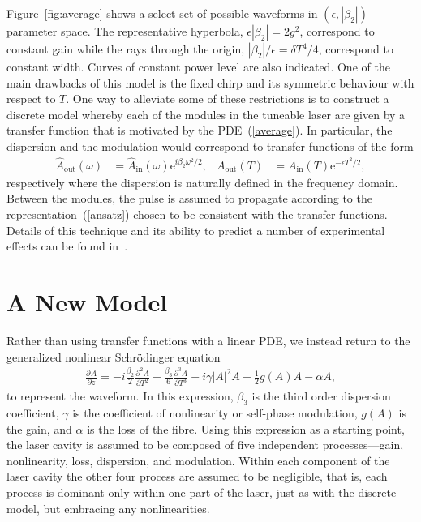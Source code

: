\documentclass[12pt]{article}
\newcommand{\pdiff}[3][]{\frac{\partial^{#1}#2}{\partial{#3}^{#1}}}
\begin{document}
Figure~\ref{fig:average} shows a select set of possible waveforms in $(\epsilon,|\beta_2|)$ parameter space. The representative hyperbola, $\epsilon|\beta_2| = 2g^2$, correspond to constant gain while the rays through the origin, $|\beta_2|/\epsilon = \delta T^4/4$, correspond to constant width. Curves of constant power level are also indicated. One of the main drawbacks of this model is the fixed chirp and its symmetric behaviour with respect to $T$. One way to alleviate some of these restrictions is to construct a discrete model whereby each of the modules in the tuneable laser are given by a transfer function that is motivated by the PDE~(\ref{average}). In particular, the dispersion and the modulation would correspond to transfer functions of the form
\begin{align}
	\widehat{A}_{\textrm{out}}(\omega) &= \widehat{A}_{\textrm{in}}(\omega)\textrm{e}^{i\beta_2\omega^2/2},&
	A_{\textrm{out}}(T) &= A_{\textrm{in}}(T)\textrm{e}^{-\epsilon T^2/2},
\end{align}
respectively where the dispersion is naturally defined in the frequency domain. Between the modules, the pulse is assumed to propagate according to the representation~(\ref{ansatz}) chosen to be consistent with the transfer functions. Details of this technique and its ability to predict a number of experimental effects can be found in~\cite{burgoyne2014}.

\section{A New Model}
Rather than using transfer functions with a linear PDE, we instead return to the generalized nonlinear Schr\"odinger equation~\cite{agrawal2013, ferreira, shtyrina, yarutkina} 
\begin{align}
\label{eq:nlse}
\pdiff{A}{z} = - i \frac{\beta_2}{2}\pdiff[2]{A}{T} + \frac{\beta_3}{6}\pdiff[3]{A}{T} 
+ i \gamma |A|^2 A + \frac{1}{2}g(A) A - \alpha A,
\end{align}
to represent the waveform. In this expression, $\beta_3$ is the third order dispersion coefficient, $\gamma$ is the coefficient of nonlinearity or self-phase modulation, $g(A)$ is the gain, and $\alpha$ is the loss of the fibre. Using this expression as a starting point, the laser cavity is assumed to be composed of five independent processes---gain, nonlinearity, loss, dispersion, and modulation. Within each component of the laser cavity the other four process are assumed to be negligible, that is, each process is dominant only within one part of the laser, just as with the discrete model, but embracing any nonlinearities.
\end{document}
